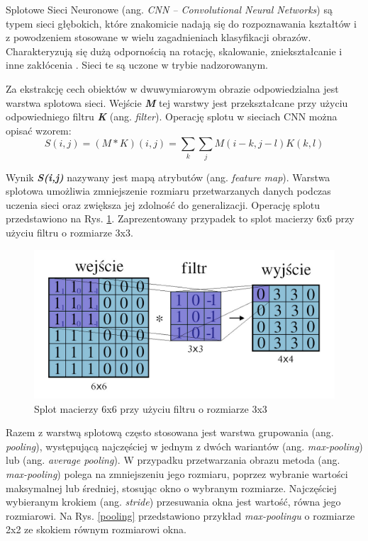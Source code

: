 Splotowe Sieci Neuronowe (ang. \emph{CNN -- Convolutional Neural Networks}) są typem sieci głębokich, które znakomicie nadają się do rozpoznawania kształtów i z powodzeniem stosowane w wielu zagadnieniach klasyfikacji obrazów. Charakteryzują się dużą odpornością na rotację, skalowanie, zniekształcanie i inne zakłócenia \cite{haykin2009neural}. Sieci te są uczone w trybie nadzorowanym. 

Za ekstrakcję cech obiektów w dwuwymiarowym obrazie odpowiedzialna jest warstwa splotowa sieci. Wejście \textbf{\emph{M}} tej warstwy jest przekształcane przy użyciu odpowiedniego filtru \textbf{\emph{K}} (ang. \emph{filter}). Operację splotu w sieciach CNN można opisać wzorem:
$$
S(i,j) = (M*K)(i,j) =\sum_{k}{\sum_{j}{M(i - k, j - l)K(k, l)}}
$$

Wynik \textbf{\emph{S(i,j)}} nazywany jest mapą atrybutów (ang. \emph{feature map}). Warstwa splotowa umożliwia zmniejszenie rozmiaru przetwarzanych danych podczas uczenia sieci oraz zwiększa jej zdolność do generalizacji. Operację splotu przedstawiono na Rys. \ref{conv}. Zaprezentowany przypadek to splot macierzy 6x6 przy użyciu filtru o rozmiarze 3x3. 


\begin{figure}[!h]
  \centering
  \includegraphics[width=\textwidth]{img/conv.jpg}
  \caption{Splot macierzy 6x6 przy użyciu filtru o rozmiarze 3x3}
  \label{conv}
\end{figure}


Razem z warstwą splotową często stosowana jest warstwa grupowania (ang. \emph{pooling}), występującą najczęściej w jednym z dwóch wariantów (ang. \emph{max-pooling}) lub (ang. \emph{average pooling}). W przypadku przetwarzania obrazu metoda (ang. \emph{max-pooling}) polega na zmniejszeniu jego rozmiaru, poprzez wybranie wartości maksymalnej lub średniej, stosując okno o wybranym rozmiarze. Najczęściej wybieranym krokiem (ang. \emph{stride}) przesuwania okna jest wartość, równa jego rozmiarowi. Na Rys. \ref{pooling} przedstawiono przykład \emph{max-poolingu} o rozmiarze 2x2 ze skokiem równym rozmiarowi okna.

